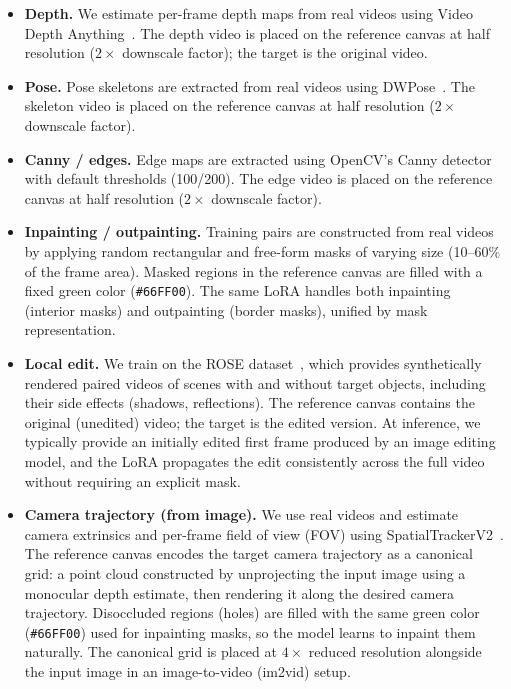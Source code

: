 \begin{itemize}
    \item \textbf{Depth.} We estimate per-frame depth maps from real videos using Video Depth Anything~\cite{chen2025videodepthanything}. The depth video is placed on the reference canvas at half resolution ($2\times$ downscale factor); the target is the original video.

    \item \textbf{Pose.} Pose skeletons are extracted from real videos using DWPose~\cite{yang2023dwpose}. The skeleton video is placed on the reference canvas at half resolution ($2\times$ downscale factor).

    \item \textbf{Canny / edges.} Edge maps are extracted using OpenCV's Canny detector with default thresholds (100/200). The edge video is placed on the reference canvas at half resolution ($2\times$ downscale factor).

    \item \textbf{Inpainting / outpainting.} Training pairs are constructed from real videos by applying random rectangular and free-form masks of varying size (10--60\% of the frame area). Masked regions in the reference canvas are filled with a fixed green color (\texttt{\#66FF00}). The same LoRA handles both inpainting (interior masks) and outpainting (border masks), unified by mask representation.

    \item \textbf{Local edit.} We train on the ROSE dataset~\cite{miao2025rose}, which provides synthetically rendered paired videos of scenes with and without target objects, including their side effects (shadows, reflections). The reference canvas contains the original (unedited) video; the target is the edited version. At inference, we typically provide an initially edited first frame produced by an image editing model, and the LoRA propagates the edit consistently across the full video without requiring an explicit mask.

    \item \textbf{Camera trajectory (from image).} We use real videos and estimate camera extrinsics and per-frame field of view (FOV) using SpatialTrackerV2~\cite{xiao2025spatialtracker}. The reference canvas encodes the target camera trajectory as a canonical grid: a point cloud constructed by unprojecting the input image using a monocular depth estimate, then rendering it along the desired camera trajectory. Disoccluded regions (holes) are filled with the same green color (\texttt{\#66FF00}) used for inpainting masks, so the model learns to inpaint them naturally. The canonical grid is placed at $4\times$ reduced resolution alongside the input image in an image-to-video (im2vid) setup.


\end{itemize}

